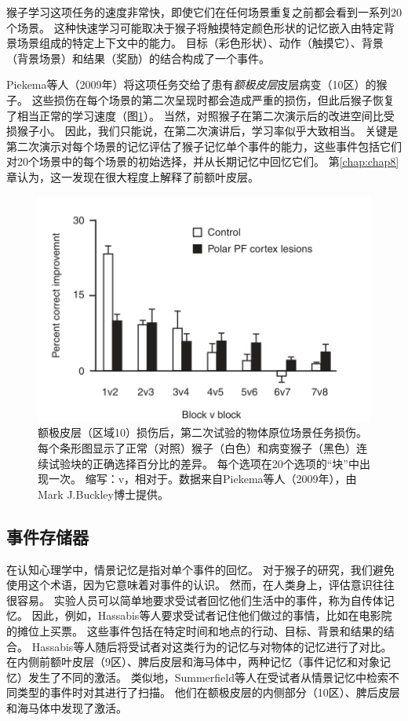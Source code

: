 猴子学习这项任务的速度非常快，即使它们在任何场景重复之前都会看到一系列20个场景。
这种快速学习可能取决于猴子将触摸特定颜色形状的记忆嵌入由特定背景场景组成的特定上下文中的能力。
目标（彩色形状）、动作（触摸它）、背景（背景场景）和结果（奖励）的结合构成了一个事件。\par


Piekema等人（2009年）将这项任务交给了患有\textit{额极皮层}皮层病变（10区）的猴子。
这些损伤在每个场景的第二次呈现时都会造成严重的损伤，但此后猴子恢复了相当正常的学习速度（图\ref{fig:3_10}）。
当然，对照猴子在第二次演示后的改进空间比受损猴子小。
因此，我们只能说，在第二次演讲后，学习率似乎大致相当。
关键是第二次演示对每个场景的记忆评估了猴子记忆单个事件的能力，这些事件包括它们对20个场景中的每个场景的初始选择，并从长期记忆中回忆它们。
第\ref{chap:chap8}章认为，这一发现在很大程度上解释了前额叶皮层。\par


\begin{figure}[!htb]
	\centering
	\includegraphics{image_pfc/Fig_3_10}
	\caption{额极皮层（区域10）损伤后，第二次试验的物体原位场景任务损伤。每个条形图显示了正常（对照）猴子（白色）和病变猴子（黑色）连续试验块的正确选择百分比的差异。
		每个选项在20个选项的“块”中出现一次。
		缩写：v，相对于。数据来自Piekema等人（2009年），由Mark J.Buckley博士提供。}
	\label{fig:3_10}
\end{figure}



\subsection{事件存储器}

在认知心理学中，情景记忆是指对单个事件的回忆。
对于猴子的研究，我们避免使用这个术语，因为它意味着对事件的认识。
然而，在人类身上，评估意识往往很容易。
实验人员可以简单地要求受试者回忆他们生活中的事件，称为自传体记忆。
因此，例如，Hassabis等人\cite{hassabis2007using}要求受试者记住他们做过的事情，比如在电影院的摊位上买票。
这些事件包括在特定时间和地点的行动、目标、背景和结果的结合。
Hassabis等人随后将受试者对这类行为的记忆与对物体的记忆进行了对比。
在内侧前额叶皮层（9区）、脾后皮层和海马体中，两种记忆（事件记忆和对象记忆）发生了不同的激活。
类似地，Summerfield等人\cite{summerfield2009decision}在受试者从情景记忆中检索不同类型的事件时对其进行了扫描。
他们在额极皮层的内侧部分（10区）、脾后皮层和海马体中发现了激活。\par



